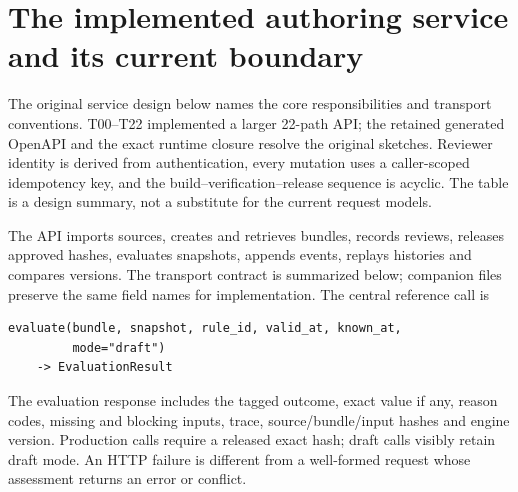 \section{The implemented authoring service and its current boundary}

The original service design below names the core responsibilities and transport
conventions. T00--T22 implemented a larger 22-path API; the retained generated
OpenAPI and the exact runtime closure resolve the original sketches. Reviewer
identity is derived from authentication, every mutation uses a caller-scoped
idempotency key, and the build--verification--release sequence is acyclic.
The table is a design summary, not a substitute for the current request models.


\label{merge:P-03c-storage-review:02}


The API imports sources, creates and retrieves bundles, records reviews, releases
approved hashes, evaluates snapshots, appends events, replays histories and
compares versions. The transport contract is summarized below; companion files
preserve the same field names for implementation. The central reference call is

\begin{minipage}{\textwidth}
\begin{lstlisting}
evaluate(bundle, snapshot, rule_id, valid_at, known_at,
         mode="draft")
    -> EvaluationResult
\end{lstlisting}
\end{minipage}

The evaluation response includes the tagged outcome, exact value if any, reason codes,
missing and blocking inputs, trace, source/bundle/input hashes and engine version.
Production calls require a released exact hash; draft calls visibly retain draft
mode. An HTTP failure is different from a well-formed request whose assessment
returns an error or conflict.

